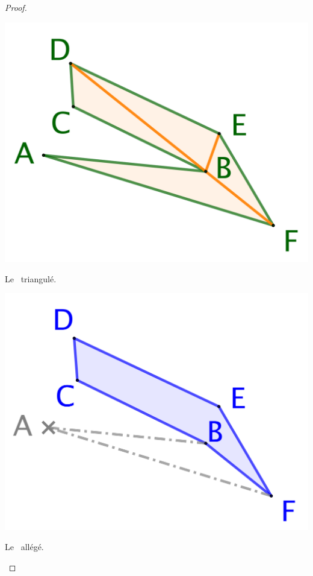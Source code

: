 \begin{proof}
\begin{multicols}{3}
        \begin{center}
            \includegraphics[scale=.4]{content/polygon/alg-area/triangulation-2.png}

            \smallskip
            Le \ngone\ triangulé.
        \end{center}


        \begin{center}
            \includegraphics[scale=.4]{content/polygon/alg-area/triangulation-3.png}

            \smallskip
            Le \ngone\ allégé.
        \end{center}
    \end{multicols}



\end{proof}
